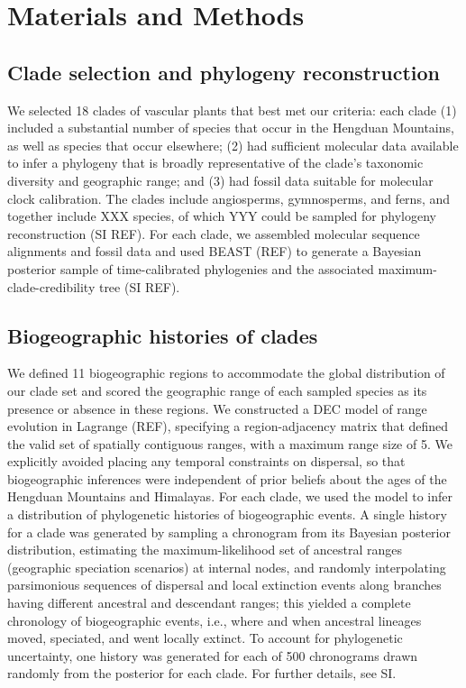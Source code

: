 \section{Materials and Methods}

\subsection{Clade selection and phylogeny reconstruction}

We selected 18 clades of vascular plants that best met our criteria: each clade (1) included a substantial number of species that occur in the Hengduan Mountains, as well as species that occur elsewhere; (2) had sufficient molecular data available to infer a phylogeny that is broadly representative of the clade's taxonomic diversity and geographic range; and (3) had fossil data suitable for molecular clock calibration. The clades include angiosperms, gymnosperms, and ferns, and together include XXX species, of which YYY could be sampled for phylogeny reconstruction (SI REF). For each clade, we assembled molecular sequence alignments and fossil data and used BEAST (REF) to generate a Bayesian posterior sample of time-calibrated phylogenies and the associated maximum-clade-credibility tree (SI REF).

\subsection{Biogeographic histories of clades}

We defined 11 biogeographic regions to accommodate the global distribution of our clade set and scored the geographic range of each sampled species as its presence or absence in these regions. We constructed a DEC model of range evolution in Lagrange (REF), specifying a region-adjacency matrix that defined the valid set of spatially contiguous ranges, with a maximum range size of 5. We explicitly avoided placing any temporal constraints on dispersal, so that biogeographic inferences were independent of prior beliefs about the ages of the Hengduan Mountains and Himalayas. For each clade, we used the model to infer a distribution of phylogenetic histories of biogeographic events. A single history for a clade was generated by sampling a chronogram from its Bayesian posterior distribution, estimating the maximum-likelihood set of ancestral ranges (geographic speciation scenarios) at internal nodes, and randomly interpolating parsimonious sequences of dispersal and local extinction events along branches having different ancestral and descendant ranges; this yielded a complete chronology of biogeographic events, i.e., where and when ancestral lineages moved, speciated, and went locally extinct. To account for phylogenetic uncertainty, one history was generated for each of 500 chronograms drawn randomly from the posterior for each clade. For further details, see SI.


